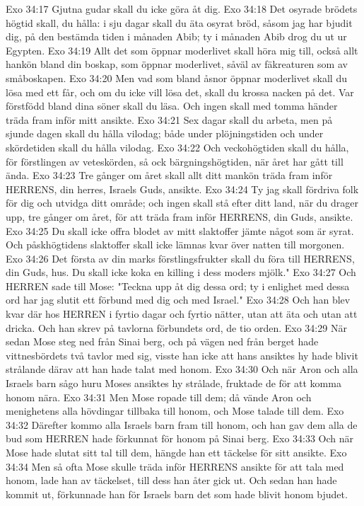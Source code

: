 Exo 34:17  Gjutna gudar skall du icke göra åt dig.
Exo 34:18  Det osyrade brödets högtid skall, du hålla: i sju dagar skall du äta osyrat bröd, såsom jag har bjudit dig, på den bestämda tiden i månaden Abib; ty i månaden Abib drog du ut ur Egypten.
Exo 34:19  Allt det som öppnar moderlivet skall höra mig till, också allt hankön bland din boskap, som öppnar moderlivet, såväl av fäkreaturen som av småboskapen.
Exo 34:20  Men vad som bland åsnor öppnar moderlivet skall du lösa med ett får, och om du icke vill lösa det, skall du krossa nacken på det. Var förstfödd bland dina söner skall du läsa. Och ingen skall med tomma händer träda fram inför mitt ansikte.
Exo 34:21  Sex dagar skall du arbeta, men på sjunde dagen skall du hålla vilodag; både under plöjningstiden och under skördetiden skall du hålla vilodag.
Exo 34:22  Och veckohögtiden skall du hålla, för förstlingen av veteskörden, så ock bärgningshögtiden, när året har gått till ända.
Exo 34:23  Tre gånger om året skall allt ditt mankön träda fram inför HERRENS, din herres, Israels Guds, ansikte.
Exo 34:24  Ty jag skall fördriva folk för dig och utvidga ditt område; och ingen skall stå efter ditt land, när du drager upp, tre gånger om året, för att träda fram inför HERRENS, din Guds, ansikte.
Exo 34:25  Du skall icke offra blodet av mitt slaktoffer jämte något som är syrat. Och påskhögtidens slaktoffer skall icke lämnas kvar över natten till morgonen.
Exo 34:26  Det första av din marks förstlingsfrukter skall du föra till HERRENS, din Guds, hus. Du skall icke koka en killing i dess moders mjölk."
Exo 34:27  Och HERREN sade till Mose: "Teckna upp åt dig dessa ord; ty i enlighet med dessa ord har jag slutit ett förbund med dig och med Israel."
Exo 34:28  Och han blev kvar där hos HERREN i fyrtio dagar och fyrtio nätter, utan att äta och utan att dricka. Och han skrev på tavlorna förbundets ord, de tio orden.
Exo 34:29  När sedan Mose steg ned från Sinai berg, och på vägen ned från berget hade vittnesbördets två tavlor med sig, visste han icke att hans ansiktes hy hade blivit strålande därav att han hade talat med honom.
Exo 34:30  Och när Aron och alla Israels barn sågo huru Moses ansiktes hy strålade, fruktade de för att komma honom nära.
Exo 34:31  Men Mose ropade till dem; då vände Aron och menighetens alla hövdingar tillbaka till honom, och Mose talade till dem.
Exo 34:32  Därefter kommo alla Israels barn fram till honom, och han gav dem alla de bud som HERREN hade förkunnat för honom på Sinai berg.
Exo 34:33  Och när Mose hade slutat sitt tal till dem, hängde han ett täckelse för sitt ansikte.
Exo 34:34  Men så ofta Mose skulle träda inför HERRENS ansikte för att tala med honom, lade han av täckelset, till dess han åter gick ut. Och sedan han hade kommit ut, förkunnade han för Israels barn det som hade blivit honom bjudet.
